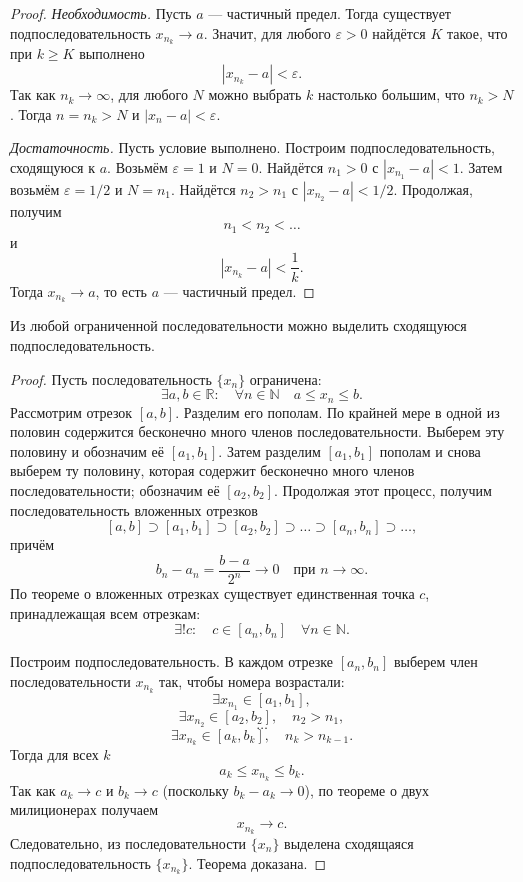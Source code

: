\begin{proof}
\emph{Необходимость.} Пусть \(a\) — частичный предел. Тогда существует
подпоследовательность \(x_{n_k}\to a\). Значит, для любого \(\varepsilon>0\)
найдётся \(K\) такое, что при \(k\ge K\) выполнено
\[
|x_{n_k}-a|<\varepsilon.
\]
Так как \(n_k\to\infty\), для любого \(N\) можно выбрать \(k\) настолько большим,
что \(n_k>N\). Тогда \(n=n_k>N\) и \(|x_n-a|<\varepsilon\).

\emph{Достаточность.} Пусть условие выполнено. Построим подпоследовательность,
сходящуюся к \(a\). Возьмём \(\varepsilon=1\) и \(N=0\). Найдётся \(n_1>0\)
с \(|x_{n_1}-a|<1\). Затем возьмём \(\varepsilon=1/2\) и \(N=n_1\). Найдётся
\(n_2>n_1\) с \(|x_{n_2}-a|<1/2\). Продолжая, получим
\[
n_1<n_2<\ldots
\]
и
\[
|x_{n_k}-a|<\frac{1}{k}.
\]
Тогда \(x_{n_k}\to a\), то есть \(a\) — частичный предел.
\end{proof}


\begin{theorem}
Из любой ограниченной последовательности можно выделить сходящуюся
подпоследовательность.
\end{theorem}

\begin{proof}
Пусть последовательность \(\{x_n\}\) ограничена:
\[
\exists a,b\in\mathbb R:\quad \forall n\in\mathbb N \quad a\le x_n\le b.
\]
Рассмотрим отрезок \([a,b]\). Разделим его пополам. По крайней мере в одной из
половин содержится бесконечно много членов последовательности. Выберем эту
половину и обозначим её \([a_1,b_1]\). Затем разделим \([a_1,b_1]\) пополам и
снова выберем ту половину, которая содержит бесконечно много членов
последовательности; обозначим её \([a_2,b_2]\). Продолжая этот процесс, получим
последовательность вложенных отрезков
\[
[a,b]\supset [a_1,b_1]\supset [a_2,b_2]\supset \ldots \supset [a_n,b_n]\supset
\ldots,
\]
причём
\[
b_n-a_n=\frac{b-a}{2^n}\to 0 \quad \text{при } n\to\infty.
\]
По теореме о вложенных отрезках существует единственная точка \(c\),
принадлежащая всем отрезкам:
\[
\exists! c:\quad c\in[a_n,b_n]\quad \forall n\in\mathbb N.
\]

Построим подпоследовательность. В каждом отрезке \([a_n,b_n]\) выберем член
последовательности \(x_{n_k}\) так, чтобы номера возрастали:
\[
\exists x_{n_1}\in[a_1,b_1],
\]
\[
\exists x_{n_2}\in[a_2,b_2],\quad n_2>n_1,
\]
\[
\ldots
\]
\[
\exists x_{n_k}\in[a_k,b_k],\quad n_k>n_{k-1}.
\]
Тогда для всех \(k\)
\[
a_k\le x_{n_k}\le b_k.
\]
Так как \(a_k\to c\) и \(b_k\to c\) (поскольку \(b_k-a_k\to 0\)), по теореме о
двух милиционерах получаем
\[
x_{n_k}\to c.
\]
Следовательно, из последовательности \(\{x_n\}\) выделена сходящаяся
подпоследовательность \(\{x_{n_k}\}\). Теорема доказана.
\end{proof}

